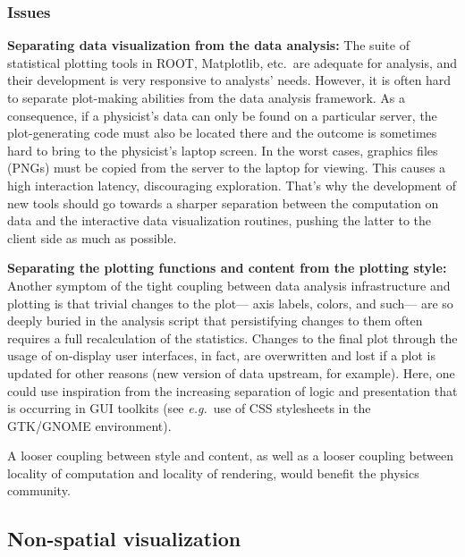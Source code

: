 \documentclass[12pt,a4paper]{article}
\begin{document}
\hypertarget{stats-issues}{%
\subsubsection{Issues}\label{stats-issues}}

{\bf Separating data visualization from the data analysis:}
The suite of statistical plotting tools in ROOT, Matplotlib, etc.\ are adequate for analysis, and their development is
very responsive to analysts’ needs. However, it is often hard to separate plot-making abilities from the data analysis framework.
As a consequence, if a physicist’s data can only be found on a particular server, the plot-generating code must also be located
there and the outcome is sometimes hard to bring to the physicist’s laptop screen. In the worst cases, graphics files (PNGs) must be copied
from the server to the laptop for viewing. This causes a high interaction latency, discouraging exploration. That’s why the
development of new tools should go towards a sharper separation between the computation on data and the interactive data visualization
routines, pushing the latter to the client side as much as possible.

{\bf Separating the plotting functions and content from the plotting style:}
Another symptom of the tight coupling between data analysis infrastructure and plotting is that trivial changes to the plot— axis labels,
colors, and such— are so deeply buried in the analysis script that persistifying changes to them often requires a full recalculation
of the statistics. Changes to the final plot through the usage of on-display user interfaces, in fact, are overwritten and lost if a
plot is updated for other reasons (new version of data upstream, for example). Here, one could use inspiration from the increasing
separation of logic and presentation that is occurring in GUI toolkits (see {\it e.g.}\ use of CSS stylesheets in the GTK/GNOME environment).

A looser coupling between style and content, as well as a looser coupling between locality of computation and locality of rendering,
would benefit the physics community.

\hypertarget{non-spatial-visualization}{%
\subsection{Non-spatial visualization}\label{non-spatial-visualization}}
\end{document}
